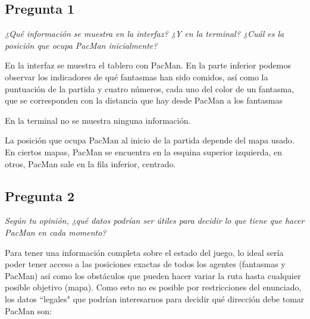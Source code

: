 \documentclass[12pt]{article}
\begin{document}
\tableofcontents

\newpage

\begin{center}

\section{Pregunta 1}

\emph{¿Qué información se muestra en la interfaz? ¿Y en la terminal? ¿Cuál es la
posición que ocupa PacMan inicialmente?}\\
\end{center}

En la interfaz se muestra el tablero con PacMan. En la parte inferior podemos
observar los indicadores de qué fantasmas han sido comidos, así como la
puntuación de la partida y cuatro números, cada uno del color de un fantasma,
que se corresponden con la distancia que hay desde PacMan a los fantasmas

En la terminal no se muestra ninguna información.

La posición que ocupa PacMan al inicio de la partida depende del mapa usado. En
ciertos mapas, PacMan se encuentra en la esquina superior izquierda, en otros,
PacMan sale en la fila inferior, centrado.


\newpage
\begin{center}
\section{Pregunta 2}

\emph{Según tu opinión, ¿qué datos podrían ser útiles para decidir lo que tiene
que hacer PacMan en cada momento?}
\end{center}

Para tener una información completa sobre el estado del juego, lo ideal sería
poder tener acceso a las posiciones exactas de todos los agentes (fantasmas y
PacMan) así como los obstáculos que pueden hacer variar la ruta hasta cualquier
posible objetivo (mapa). Como esto no es posible por restricciones del
enunciado, los datos ``legales" que podrían interesarnos para decidir qué
dirección debe tomar PacMan son:
\end{document}
